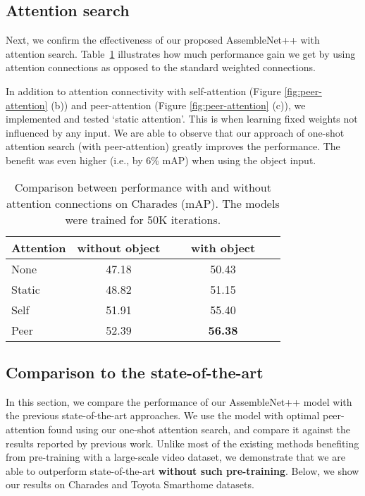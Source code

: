 \documentclass[runningheads]{llncs}
\begin{document}
\subsection{Attention search}
\label{subsec:att-abl}

Next, we confirm the effectiveness of our proposed AssembleNet++ with attention search. Table~\ref{tab:attention} illustrates how much performance gain we get by using attention connections as opposed to the standard weighted connections. 

In addition to attention connectivity with self-attention (Figure \ref{fig:peer-attention} (b)) and peer-attention (Figure \ref{fig:peer-attention} (c)), we implemented and tested `static attention'. This is when learning fixed weights not influenced by any input. We are able to observe that our approach of one-shot attention search (with peer-attention) greatly improves the performance. The benefit was even higher (i.e., by 6\% mAP) when using the object input.


\begin{table}
\setlength\tabcolsep{5pt}
\caption{Comparison between performance with and without attention connections on Charades (mAP). The models were trained for 50K iterations.}
\label{tab:attention}
\begin{center}
\begin{tabular}{l|c|c}
\hline
Attention &  without object  & ~~~with object~~~ \\ 
\hline
None &  47.18  & 50.43 \\   
Static &  48.82  & 51.15 \\   
Self &  51.91  & 55.40 \\   
Peer &  52.39  & \textbf{56.38} \\   
\hline
\end{tabular}
\end{center}
\end{table}

\subsection{Comparison to the state-of-the-art}
\label{subsec:sota}

In this section, we compare the performance of our AssembleNet++ model with the previous state-of-the-art approaches. We use the model with optimal peer-attention found using our one-shot attention search, and compare it against the results reported by previous work. Unlike most of the existing methods benefiting from pre-training with a large-scale video dataset, we demonstrate that we are able to outperform state-of-the-art \textbf{without such pre-training}. Below, we show our results on Charades and Toyota Smarthome datasets.
\end{document}

